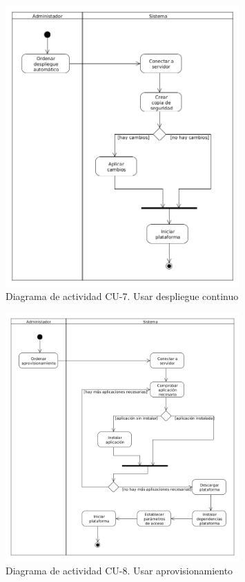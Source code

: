 \begin{figure}[!hbt]
  \begin{center}
  \includegraphics[width=0.8\textwidth]{imagenes/diagrama_actividad_cu_7.png}
  \caption{Diagrama de actividad CU-7. Usar despliegue continuo}
  \label{fig:diag_ca_us_7}
  \end{center}
\end{figure}

\begin{figure}[!hbt]
  \begin{center}
  \includegraphics[width=0.8\textwidth]{imagenes/diagrama_actividad_cu_8.png}
  \caption{Diagrama de actividad CU-8. Usar aprovisionamiento}
  \label{fig:diag_ca_us_8}
  \end{center}
\end{figure}

